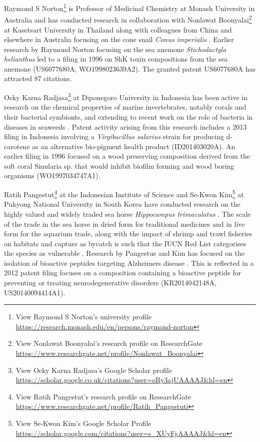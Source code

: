 \documentclass[]{book}
\let\rmarkdownfootnote\footnote%
\def\footnote{\protect\rmarkdownfootnote}
\theoremstyle{definition}
\theoremstyle{definition}
\theoremstyle{definition}
\theoremstyle{remark}
\begin{document}
Raymond S Norton\footnote{View Raymond S Norton's university profile
  \url{https://research.monash.edu/en/persons/raymond-norton}} is
Professor of Medicinal Chemistry at Monash University in Australia and
has conducted research in collaboration with Nonlawat
Boonyalai\footnote{View Nonlawat Boonyalai's research profile on
  ResearchGate
  \url{https://www.researchgate.net/profile/Nonlawat_Boonyalai}} at
Kasetsart University in Thailand along with colleagues from China and
elsewhere in Australia focusing on the cone snail \emph{Conus
imperialis} \citep{Ye_2012}. Earlier research by Raymond Norton focusing
on the sea anemone \emph{Stichodactyla helianthus} led to a filing in
1996 on ShK toxin compositions from the sea anemone (US6077680A,
WO1998023639A2). The granted patent US6077680A has attracted 87
citations.

Ocky Karna Radjasa\footnote{View Ocky Karna Radjasa's Google Scholar
  profile
  \url{https://scholar.google.co.uk/citations?user=oRy3ajUAAAAJ\&hl=en}}
at Diponegoro University in Indonesia has been active in research on the
chemical properties of marine invertebrates, notably corals and their
bacterial symbionts, and extending to recent work on the role of
bacteria in diseases in seaweeds
\citep{Ayuningrum_2017, Trianto_2017, Syafitri_2017}. Patent activity
arising from this research includes a 2013 filing in Indonesia involving
a \emph{Virgibacillus salarius} strain for producing d-carotene as an
alternative bio-pigment health product (ID201403020A). An earlier filing
in 1996 focused on a wood preserving composition derived from the soft
coral Sinularia sp. that would inhibit biofilm forming and wood boring
organisms (WO1997034747A1).

Ratih Pangestut\footnote{View Ratih Pangestut's research profile on
  ResearchGate
  \url{https://www.researchgate.net/profile/Ratih_Pangestuti}} at the
Indonesian Institute of Science and Se-Kwon Kim\footnote{View Se-Kwon
  Kim's Google Scholar Profile
  \url{https://scholar.google.com/citations?user=s_XUyFgAAAAJ\&hl=en}}
at Pukyong National University in South Korea have conducted research on
the highly valued and widely traded sea horse \emph{Hippocampus
trimaculatus} \citep{Pangestuti_2015}. The scale of the trade in the sea
horse in dried form for traditional medicines and in live form for the
aquarium trade, along with the impact of shrimp and trawl fisheries on
habitats and capture as bycatch is such that the IUCN Red List
categorises the species as vulnerable \citep{Hippocampus_2012}. Research
by Pangestus and Kim has focused on the isolation of bioactive peptides
targeting Alzheimers disease \citep{Pangestuti_2015}. This is reflected
in a 2012 patent filing focuses on a composition containing a bioactive
peptide for preventing or treating neurodegenerative disorders
(KR2014042148A, US20140094414A1).
\end{document}
